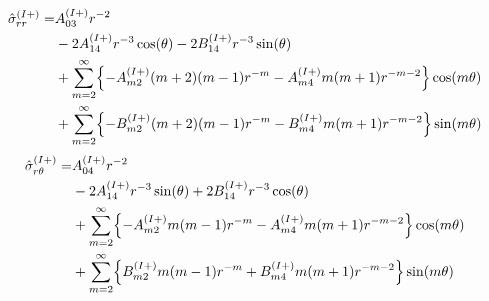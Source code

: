 \begin{align}
	\hat{\sigma}_{rr}^{(I+)} =&A_{03}^{(I+)}r^{-2}
	\nonumber
	\\
	&-2A_{14}^{(I+)}r^{-3}\cos(\theta)
	-2B_{14}^{(I+)}r^{-3}\sin(\theta)
	\nonumber
	\\
	&+\sum_{m=2}^{\infty}\Bigl\{
	-A_{m2}^{(I+)}(m+2)(m-1)r^{-m}
	-A_{m4}^{(I+)}m(m+1)r^{-m-2}\Bigr\}\cos(m\theta)
	\nonumber
	\\
	&+\sum_{m=2}^{\infty}\Bigl\{
	-B_{m2}^{(I+)}(m+2)(m-1)r^{-m}
	-B_{m4}^{(I+)}m(m+1)r^{-m-2}\Bigr\}\sin(m\theta)
	\label{eq:SigmaRROut1}
\end{align}
\begin{align}
	\hat{\sigma}_{r\theta}^{(I+)} =&A_{04}^{(I+)}r^{-2}
	\nonumber
	\\
	&-2A_{14}^{(I+)}r^{-3}\sin(\theta)
	+2B_{14}^{(I+)}r^{-3}\cos(\theta)
	\nonumber
	\\
	&+\sum_{m=2}^{\infty}\Bigl\{
	-A_{m2}^{(I+)}m(m-1)r^{-m}
	-A_{m4}^{(I+)}m(m+1)r^{-m-2}\Bigr\}\cos(m\theta)
	\nonumber
	\\
	&+\sum_{m=2}^{\infty}\Bigl\{
	B_{m2}^{(I+)}m(m-1)r^{-m}
	+B_{m4}^{(I+)}m(m+1)r^{-m-2}\Bigr\}\sin(m\theta)
	\label{eq:SigmaRThOut1}
\end{align}

\newpage
